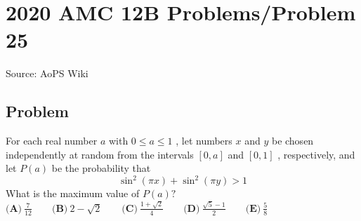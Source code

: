 \documentclass[12pt]{article}
\begin{document}
\section*{{2020 AMC 12B Problems/Problem 25}}
Source: AoPS Wiki

\subsection*{Problem}
For each real number $a$ with $0 \leq a \leq 1$ , let numbers $x$ and $y$ be chosen independently at random from the intervals $[0, a]$ and $[0, 1]$ , respectively, and let $P(a)$ be the probability that \[\sin^2{(\pi x)} + \sin^2{(\pi y)} > 1\] What is the maximum value of $P(a)?$ $\textbf{(A)}\ \frac{7}{12} \qquad\textbf{(B)}\ 2 - \sqrt{2} \qquad\textbf{(C)}\ \frac{1+\sqrt{2}}{4} \qquad\textbf{(D)}\ \frac{\sqrt{5}-1}{2} \qquad\textbf{(E)}\ \frac{5}{8}$
\end{document}
